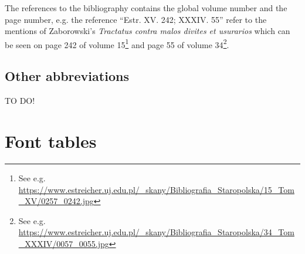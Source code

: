 \documentclass[12pt]{article}
\begin{document}
  The references to the bibliography contains the global volume number
  and the page number, e.g.  the reference ``Estr. XV. 242;
  XXXIV. 55'' refer to the mentions of Zaborowski's \textit{Tractatus
    contra malos divites et usurarios} which can be seen on page 242
  of volume 15\footnote{See e.g.
    \url{https://www.estreicher.uj.edu.pl/_skany/Bibliografia_Staropolska/15_Tom_XV/0257_0242.jpg}}
  and page 55 of volume 34\footnote{See e.g.
    \url{https://www.estreicher.uj.edu.pl/_skany/Bibliografia_Staropolska/34_Tom_XXXIV/0057_0055.jpg}}.

\subsection{Other abbreviations}
\label{sec:other-abbreviations}


TO DO!












\newpage
\section{\Huge Font tables}
\label{sec:font-tables}
\end{document}
